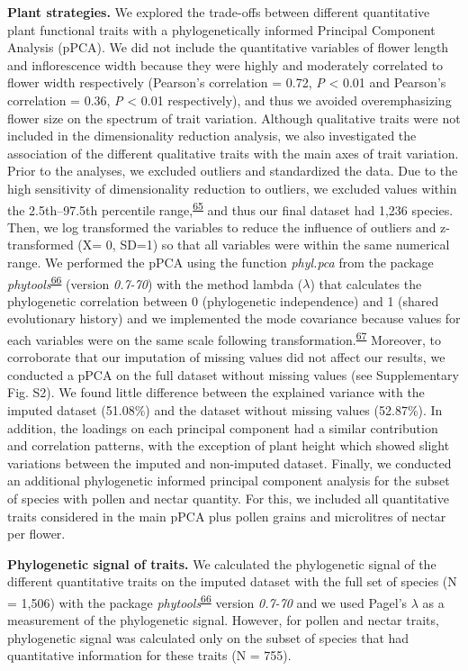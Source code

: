 \documentclass[
  12pt,
  a4paper,
]{article}
\begin{document}
\textbf{Plant strategies.} We explored the trade-offs between different quantitative plant functional traits with a phylogenetically informed Principal Component Analysis (pPCA). We did not include the quantitative variables of flower length and inflorescence width because they were highly and moderately correlated to flower width respectively (Pearson's correlation = 0.72, \emph{P} \textless{} 0.01 and Pearson's correlation = 0.36, \emph{P} \textless{} 0.01 respectively), and thus we avoided overemphasizing flower size on the spectrum of trait variation. Although qualitative traits were not included in the dimensionality reduction analysis, we also investigated the association of the different qualitative traits with the main axes of trait variation. Prior to the analyses, we excluded outliers and standardized the data. Due to the high sensitivity of dimensionality reduction to outliers, we excluded values within the 2.5th--97.5th percentile range,\textsuperscript{\protect\hyperlink{ref-legendre2012}{65}} and thus our final dataset had 1,236 species. Then, we log transformed the variables to reduce the influence of outliers and z-transformed (X= 0, SD=1) so that all variables were within the same numerical range. We performed the pPCA using the function \emph{phyl.pca} from the package \emph{phytools}\textsuperscript{\protect\hyperlink{ref-revell2012}{66}} (version \emph{0.7-70}) with the method lambda (\(\lambda\)) that calculates the phylogenetic correlation between 0 (phylogenetic independence) and 1 (shared evolutionary history) and we implemented the mode covariance because values for each variables were on the same scale following transformation.\textsuperscript{\protect\hyperlink{ref-abdi2010}{67}} Moreover, to corroborate that our imputation of missing values did not affect our results, we conducted a pPCA on the full dataset without missing values (see Supplementary Fig. S2). We found little difference between the explained variance with the imputed dataset (51.08\%) and the dataset without missing values (52.87\%). In addition, the loadings on each principal component had a similar contribution and correlation patterns, with the exception of plant height which showed slight variations between the imputed and non-imputed dataset. Finally, we conducted an additional phylogenetic informed principal component analysis for the subset of species with pollen and nectar quantity. For this, we included all quantitative traits considered in the main pPCA plus pollen grains and microlitres of nectar per flower.

\textbf{Phylogenetic signal of traits.} We calculated the phylogenetic signal of the different quantitative traits on the imputed dataset with the full set of species (N = 1,506) with the package \emph{phytools}\textsuperscript{\protect\hyperlink{ref-revell2012}{66}} version \emph{0.7-70} and we used Pagel's \(\lambda\) as a measurement of the phylogenetic signal. However, for pollen and nectar traits, phylogenetic signal was calculated only on the subset of species that had quantitative information for these traits (N = 755).
\end{document}
